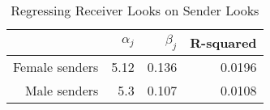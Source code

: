 \begin{table}[ht]
\centering
\caption{Regressing Receiver Looks on Sender Looks} 
\label{tab:receiver_on_sender}
\begin{tabular}{rrrr}
  \hline
 & $\alpha_j$ & $\beta_j$ & R-squared \\ 
  \hline
Female senders & 5.12 & 0.136 & 0.0196 \\ 
  Male senders &  5.3 & 0.107 & 0.0108 \\ 
   \hline
\end{tabular}
\end{table}

